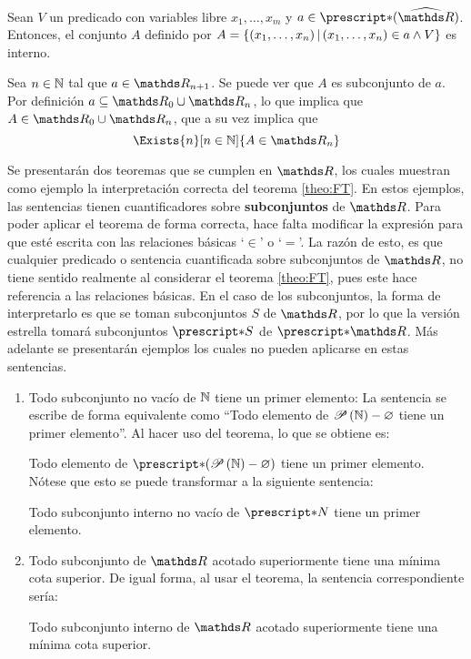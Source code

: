 \begin{theorem}
  Sean $V$ un predicado con variables libre $x_1,\dots,x_m$ y
  $a\in\st{(\Rh)}$. Entonces, el conjunto $A$ definido por
  $A=\left\{(x_1,\dots,x_n)\,\middle|\,(x_1,\dots,x_n)\in a \land V\right\}$ es interno.
\end{theorem}
\begin{demo}
  Sea $n\in\mathbb{N}$ tal que $a\in\R_{n+1}$. Se puede ver que $A$ es
  subconjunto de $a$. Por definición $a\subseteq \R_0 \cup \R_n$,
  lo que implica que $A\in\R_0\cup\R_n$, que a su vez implica que
  \[\Exists{n}[n\in\N]{A\in\R_n}\]
\end{demo}

Se presentarán dos teoremas que se cumplen en $\R$, los cuales muestran
como ejemplo la interpretación correcta del teorema \ref{theo:FT}.
En estos ejemplos, las sentencias tienen cuantificadores sobre
\textbf{subconjuntos} de $\R$. Para poder aplicar el teorema de forma
correcta, hace falta modificar la expresión para que esté escrita con
las relaciones básicas `$\in$' o `$=$'. La razón de esto, es que cualquier
predicado o sentencia cuantificada sobre subconjuntos de $\R$, no tiene
sentido realmente al considerar el teorema \ref{theo:FT}, pues este hace
referencia a las relaciones básicas. En el caso de los subconjuntos,
la forma de interpretarlo es que se toman subconjuntos $S$ de $\R$, por
lo que la versión estrella tomará subconjuntos $\st{S}$ de $\st{\R}$. Más
adelante se presentarán ejemplos los cuales no pueden aplicarse en
estas sentencias.

\begin{enumerate}
  \item Todo subconjunto no vacío de $\mathbb{N}$ tiene un primer elemento:
        La sentencia se escribe de forma equivalente como
        ``Todo elemento de $\mathscr{P}\left(\mathbb{N}\right) - \varnothing$ tiene un primer
        elemento''. Al hacer uso del teorema, lo que se obtiene es:

        Todo elemento de $\st{(\Pts{\N}-\varnothing)}$ tiene un primer
        elemento. Nótese que esto se puede transformar a la siguiente
        sentencia:

        Todo subconjunto interno no vacío de $\st{N}$ tiene un primer
        elemento.
  \item Todo subconjunto de $\R$ acotado superiormente tiene una mínima
        cota superior. De igual forma, al usar el teorema, la sentencia
        correspondiente sería:

        Todo subconjunto interno de $\R$ acotado superiormente tiene
        una mínima cota superior.
\end{enumerate}
